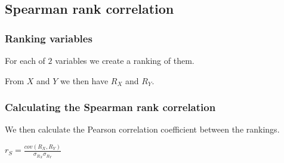 
\subsection{Spearman rank correlation}

\subsubsection{Ranking variables}

For each of \(2\) variables we create a ranking of them.

From \(X\) and \(Y\) we then have \(R_X\) and \(R_Y\).

\subsubsection{Calculating the Spearman rank correlation}

We then calculate the Pearson correlation coefficient between the rankings.

\(r_S=\frac{cov(R_X, R_Y)}{\sigma_{R_X}\sigma_{R_Y}}\)

